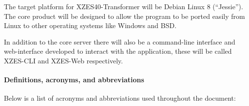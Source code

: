 The target platform for XZES40-Transformer will be Debian Linux 8 (``Jessie'').
The core product will be designed to allow the program to be ported easily from Linux to other operating systems like Windows and BSD.

In addition to the core server there will also be a command-line interface and web-interface developed to interact with the application, these will be called XZES-CLI and XZES-Web respectively.


\paragraph{Definitions, acronyms, and abbreviations}

Below is a list of acronyms and abbreviations used throughout the document:

